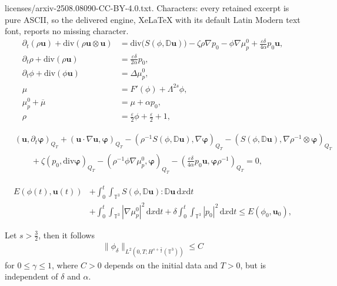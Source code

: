 \documentclass[10pt,a4paper]{amsart}
\begin{document}
licenses/arxiv-2508.08090-CC-BY-4.0.txt. Characters: every retained excerpt is pure ASCII, so the delivered engine, XeLaTeX with its default Latin Modern text font, reports no missing character.
	\begin{align}
		\label{model4-1}
		\partial_t(\rho  \mathbf{u}) + \mathrm{div}\left (\rho  \mathbf{u}\otimes
		\mathbf{u}\right) 
		& = \mathrm{div}\big(S(\phi,\mathbb{ D}\mathbf{u})\big)
		- \zeta\rho\nabla p_{0}
		- \phi \nabla \mu_{p}^{0}
		+ \frac{\varepsilon\delta}{4\alpha}  p_{0} \mathbf{u}, 
		\\\label{model4-2}
		\partial_t \rho+\mathrm{div} (\rho \mathbf{u})& =\frac{\varepsilon\delta}{2\alpha} p_{0}, 
		\\
		\label{model4-3}
		\partial_t\phi + \mathrm{div}(\phi  \mathbf{u})& =\Delta\mu_p^{0}, \\
		\label{model4-4}
		\mu& =F'(\phi)+\Lambda^{2s} \phi, \\
		\label{model4-5}
		\mu_p^{0}+\overline{\mu}& =\mu+\alpha p_{0}, \\\rho& =\frac{\varepsilon}{2}\phi+\frac{\varepsilon}{2}+1,
	\end{align}

		\begin{align}\label{weak1}
			&\nonumber(\mathbf{u},\partial_{t}\boldsymbol{\varphi})_{Q_{T}}+(\mathbf{u}\cdot\nabla\mathbf{u},\boldsymbol{\varphi})_{Q_{T}}-(\rho^{-1}S(\phi,\mathbb{ D}\mathbf{u}),\nabla\boldsymbol{\varphi})_{Q_{T}}-(S(\phi,\mathbb{ D}\mathbf{u}),\nabla\rho^{-1}\otimes\boldsymbol{\varphi})_{Q_{T}}
			\\&\qquad
			+\zeta(p_{0},\mathrm{div}\boldsymbol{\varphi})_{Q_{T}}-(\rho^{-1}\phi \nabla \mu_{p}^{0},\boldsymbol{\varphi})_{Q_{T}}
			-(\frac{\varepsilon\delta}{4\alpha}  p_{0} \mathbf{u},\boldsymbol{\varphi}\rho^{-1})_{Q_{T}}=0,
		\end{align}

		\begin{align}\label{ConEnL2}
			\nonumber E(\phi(t),\mathbf{u}(t))&+\int_0^{t}\int_{\mathbb{T}^{3}}S(\phi,\mathbb{ D}\mathbf{u}):\mathbb{ D}\mathbf{u}\,\mathrm d x\mathrm dt
			\\&
			+\int_0^{t}\int_{\mathbb{T}^{3}}|\nabla \mu_{p}^{0}|^{2}\,\mathrm d x\mathrm dt+\delta\int_0^{t}\int_{\mathbb{T}^{3}}|{p}_{0}|^{2}\,\mathrm d x\mathrm dt\leq E(\phi_0,\mathbf{u}_0),
		\end{align}

			\begin{lemma}\label{lem:higher eatimate}
				
				Let $s>\frac{3}{2}$, then it follows
				\begin{align*}
					\|\phi_\delta\|_{L^{2}(0,T;H^{s+\frac{\gamma}{2}}(\mathbb{T}^{3}))}
					\leq C
				\end{align*}
				for  $0\leq\gamma\leq 1$, where $C>0$ depends on the initial data and $ T> 0$, but is independent of $\delta$ and $\alpha$.
			\end{lemma}
\end{document}
